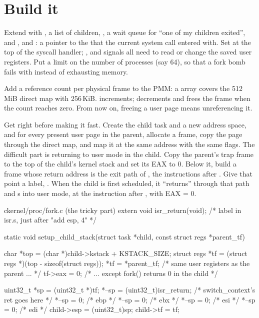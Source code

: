 \documentclass[11pt,a4paper]{article}
\begin{document}
\section{Build it}

Extend  with , a list of children, , a wait queue for ``one of my children
exited'',  and , and : a pointer to the  that the current system
call entered with. Set  at the top of the syscall handler; ,  and signals
all need to read or change the saved user registers. Put a limit on the number of processes (say 64), so that a fork
bomb fails with  instead of exhausting memory.

Add a reference count per physical frame to the PMM: a  array covers the 512\,MiB direct map with
256\,KiB.  increments;  decrements and frees the frame when the count reaches
zero. From now on, freeing a user page means unreferencing it.

Get  right before making it fast. Create the child task and a new address space, and for every present
user page in the parent, allocate a frame, copy the page through the direct map, and map it at the same address with
the same flags. The difficult part is returning to user mode in the child. Copy the parent's trap frame to the top of
the child's kernel stack and set its EAX to 0. Below it, build a  frame whose return address is
the exit path of , the instructions after . Give that point a label,
. When the child is first scheduled, it ``returns'' through that path and s into user mode,
at the instruction after , with EAX = 0.

\begin{lst}{c}{kernel/proc/fork.c (the tricky part)}
extern void isr_return(void);               /* label in isr.s, just after "add esp, 4" */

static void setup_child_stack(struct task *child, const struct regs *parent_tf)
{
    char *top = (char *)child->kstack + KSTACK_SIZE;
    struct regs *tf = (struct regs *)(top - sizeof(struct regs));
    *tf = *parent_tf;                        /* same user registers as the parent ...  */
    tf->eax = 0;                             /* ... except fork() returns 0 in the child */

    uint32_t *sp = (uint32_t *)tf;
    *--sp = (uint32_t)isr_return;            /* switch_context's ret goes here */
    *--sp = 0;                               /* ebp */
    *--sp = 0;                               /* ebx */
    *--sp = 0;                               /* esi */
    *--sp = 0;                               /* edi */
    child->esp = (uint32_t)sp;
    child->tf  = tf;
}
\end{lst}
\end{document}
